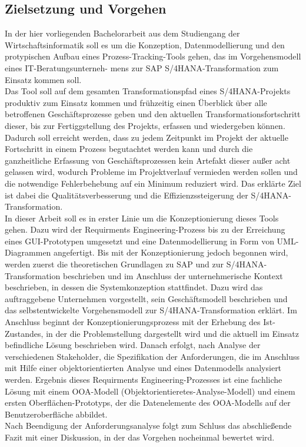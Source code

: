 \subsection{Zielsetzung und Vorgehen}
In der hier vorliegenden Bachelorarbeit aus dem Studiengang der Wirtschaftsinformatik soll es um die Konzeption, Datenmodellierung und den protypischen Aufbau eines Prozess-Tracking-Tools gehen, das im Vorgehensmodell eines IT-Beratungsunterneh- mens zur SAP S/4HANA-Transformation zum Einsatz kommen soll.\\ Das Tool soll auf dem gesamten Transformationspfad eines S/4HANA-Projekts produktiv zum Einsatz kommen und frühzeitig einen Überblick über alle betroffenen Geschäftsprozesse geben und den aktuellen Transformationsfortschritt dieser, bis zur Fertiggstellung des Projekts, erfassen und wiedergeben können. Dadurch soll erreicht werden, dass zu jedem Zeitpunkt im Projekt der aktuelle Fortschritt in einem Prozess begutachtet werden kann und durch die ganzheitliche Erfassung von Geschäftsprozessen kein Artefakt dieser außer acht gelassen wird, wodurch Probleme im Projektverlauf vermieden werden sollen und die notwendige Fehlerbehebung auf ein Minimum reduziert wird. Das erklärte Ziel ist dabei die Qualitätsverbesserung und die Effizienzssteigerung der S/4HANA-Transformation.\\
In dieser Arbeit soll es in erster Linie um die Konzeptionierung dieses Tools gehen. Dazu wird der Requirments Engineering-Prozess bis zu der Erreichung eines GUI-Prototypen umgesetzt und eine Datenmodellierung in Form von UML-Diagrammen angefertigt. Bis mit der Konzeptionierung jedoch begonnen wird, werden zuerst die theoretischen Grundlagen zu SAP und zur S/4HANA-Transformation beschrieben und im Anschluss der unternehmerische Kontext beschrieben, in dessen die Systemkonzeption stattfindet. Dazu wird das auftraggebene Unternehmen vorgestellt, sein Geschäftsmodell beschrieben und das selbstentwickelte Vorgehensmodell zur S/4HANA-Transformation erklärt. Im Anschluss beginnt der Konzeptionierungsprozess mit der Erhebung des Ist-Zustandes, in der die Problemstellung dargestellt wird und die aktuell im Einsatz befindliche Lösung beschrieben wird. Danach erfolgt, nach Analyse der verschiedenen Stakeholder, die Spezifikation der Anforderungen, die im Anschluss mit Hilfe einer objektorientierten Analyse und eines Datenmodells analysiert werden. Ergebnis dieses Requirments Engineering-Prozesses ist eine fachliche Lösung mit einem OOA-Modell (Objektorientieretes-Analyse-Modell) und einem ersten Oberflächen-Prototyps, der die Datenelemente des OOA-Modells auf der Benutzeroberfläche abbildet.\\Nach Beendigung der Anforderungsanalyse folgt zum Schluss das abschließende Fazit mit einer Diskussion, in der das Vorgehen nocheinmal bewertet wird. 

